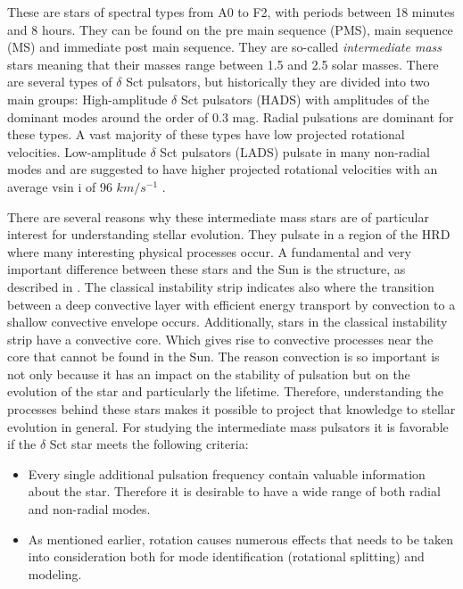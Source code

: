 These are stars of spectral types from A0 to F2, with periods between 18 minutes and 8 hours. They can be found on the pre main sequence (PMS), main sequence (MS) and immediate post main sequence. They are so-called \textit{intermediate mass} stars meaning that their masses range between 1.5 and 2.5 solar masses. There are several types of $\delta$ Sct pulsators, but historically they are divided into two main groups: High-amplitude $\delta$ Sct pulsators (HADS) with amplitudes of the dominant modes around the order of 0.3 mag. Radial pulsations are dominant for these types. A vast majority of these types have low projected rotational velocities. Low-amplitude $\delta$ Sct pulsators (LADS) pulsate in many non-radial modes and are suggested to have higher projected rotational velocities with an average vsin i of 96 $km / s^{-1}$ \citep{solano1997spectroscopic}.

There are several reasons why these intermediate mass stars are of particular interest for understanding stellar evolution. They pulsate in a region of the HRD where many interesting physical processes occur. A fundamental and very important difference between these stars and the Sun is the structure, as described in . The classical instability strip indicates also where the transition between a deep convective layer with efficient energy transport by convection to a shallow convective envelope occurs. Additionally, stars in the classical instability strip have a convective core. Which gives rise to convective processes near the core that cannot be found in the Sun. The reason convection is so important is not only because it has an impact on the stability of pulsation but on the evolution of the star and particularly the lifetime. Therefore, understanding the processes behind these stars makes it possible to project that knowledge to stellar evolution in general. 
For studying the intermediate mass pulsators it is favorable if the $\delta$ Sct star meets the following criteria: 

\begin{itemize}
    \item Every single additional pulsation frequency contain valuable information about the star. Therefore it is desirable to have a wide range of both radial and non-radial modes. 
    \item As mentioned earlier, rotation causes numerous effects that needs to be taken into consideration both for mode identification (rotational splitting) and modeling. 
\end{itemize}

